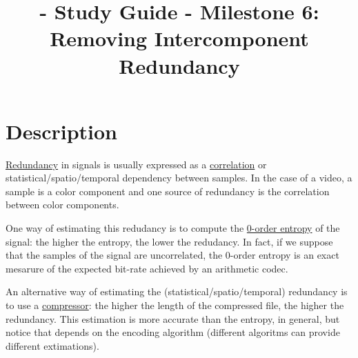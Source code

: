 
\title{\SM{} - Study Guide - Milestone 6: Removing Intercomponent Redundancy}

\maketitle

\section{Description}

\href{https://en.wikipedia.org/wiki/Data_redundancy}{Redundancy} in
signals is usually expressed as a
\href{https://en.wikipedia.org/wiki/Correlation_and_dependence}{correlation}
or statistical/spatio/temporal dependency between samples. In the case
of a video, a sample is a color component and one source of redundancy
is the correlation between color components.

One way of estimating this redudancy is to compute the
\href{https://en.wikipedia.org/wiki/Entropy_(information_theory)}{0-order
  entropy} of the signal: the higher the entropy, the lower the
redudancy. In fact, if we suppose that the samples of the signal are
uncorrelated, the 0-order entropy is an exact mesarure of the expected
bit-rate achieved by an arithmetic codec.

An alternative way of estimating the (statistical/spatio/temporal)
redundancy is to use a
\href{https://en.wikipedia.org/wiki/Data_compression}{compressor}: the
higher the length of the compressed file, the higher the
redundancy. This estimation is more accurate than the entropy, in
general, but notice that depends on the encoding algorithm (different
algoritms can provide different extimations).

